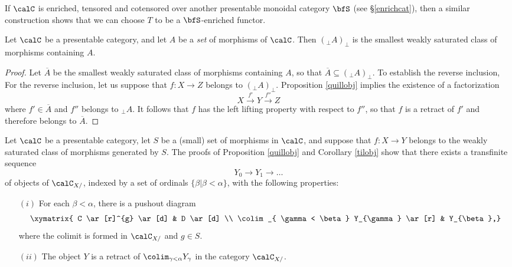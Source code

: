 \begin{remark}
If $\calC$ is enriched, tensored and cotensored over another presentable monoidal category
$\bfS$ (see \S \ref{enrichcat}), then a similar construction shows that we can choose
$T$ to be a $\bfS$-enriched functor.
\end{remark}

\begin{corollary}\label{tilobj}
Let $\calC$ be a presentable category, and let $A$ be a {\em set} of morphisms of $\calC$.
Then $(_{\perp} A)_{\perp}$ is the smallest weakly saturated class of morphisms containing $A$.
\end{corollary}

\begin{proof}
Let $\overline{A}$ be the smallest weakly saturated class of morphisms containing $A$, so that
$\overline{A} \subseteq (_{\perp} A)_{\perp}$. To establish the reverse inclusion, 
For the reverse inclusion, let us suppose that $f: X \rightarrow Z$ belongs to
$(_{\perp} A)_{\perp}$. Proposition \ref{quillobj} implies the existence of a factorization
$$ X \stackrel{f'}{\rightarrow} Y \stackrel{f''}{\rightarrow} Z$$
where $f' \in \overline{A}$ and $f''$ belongs to $_{\perp} A$. It follows that $f$ has the left lifting property with respect to $f''$, so that $f$ is a retract of $f'$ and therefore belongs to $\overline{A}$.
\end{proof}

\begin{remark}\label{easyprest}
Let $\calC$ be a presentable category, let $S$ be a (small) set of morphisms in $\calC$, and suppose that $f: X \rightarrow Y$ belongs to the weakly saturated class of morphisms generated by $S$.
The proofs of Proposition \ref{quillobj} and Corollary \ref{tilobj} show that there exists a transfinite sequence 
$$ Y_0 \rightarrow Y_1 \rightarrow \ldots $$
of objects of $\calC_{X/}$, indexed by a set of ordinals $\{ \beta | \beta < \alpha \}$, with the following properties:
\begin{itemize}
\item[$(i)$] For each $\beta < \alpha$, there is a pushout diagram 
$$ \xymatrix{ C \ar[r]^{g} \ar[d] & D \ar[d] \\
\colim_{ \gamma < \beta} Y_{\gamma} \ar[r] & Y_{\beta},}$$
where the colimit is formed in $\calC_{X/}$ and $g \in S$.
\item[$(ii)$] The object $Y$ is a retract of $\colim_{\gamma < \alpha} Y_{\gamma}$
in the category $\calC_{X/}$.
\end{itemize}
\end{remark}

